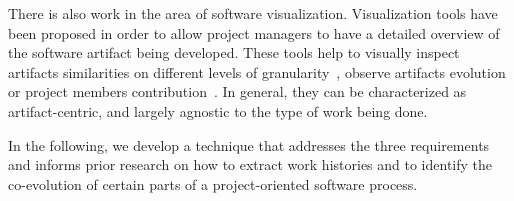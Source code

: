 
There is also work in the area of software visualization. 
Visualization tools have been proposed in order to allow project managers to have a detailed overview of the software artifact being developed. These tools help to visually inspect artifacts similarities on different levels of granularity~\cite{Voinea2006b}, observe artifacts evolution or project members contribution~\cite{Ripley2007,Greene2015}. In general, they can be characterized as artifact-centric, and largely agnostic to the type of work being done.


In the following, we develop a technique that addresses the three requirements and informs prior research on how to extract work histories and to identify the co-evolution of certain parts of a project-oriented software process.



